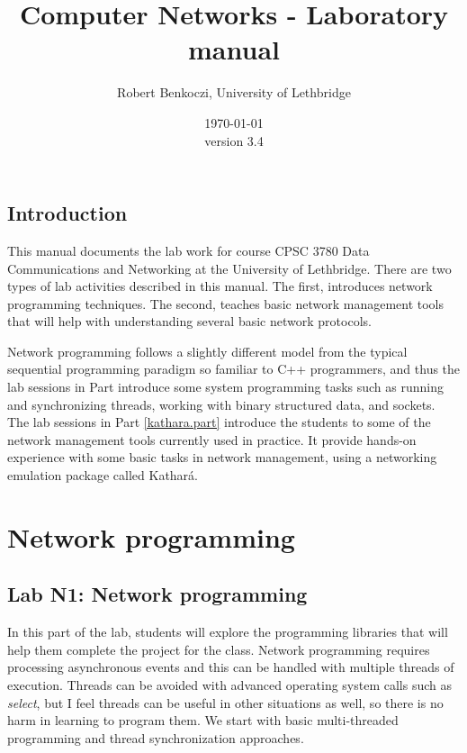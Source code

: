 \documentclass[12pt]{book}
\title{Computer Networks - Laboratory manual}    %
\author{Robert Benkoczi, University of Lethbridge}    %
\date{\today\\ version 3.4}  %
\newcommand{\kathara}{Kathar\'a}
\begin{document}
\frontmatter                            %
\maketitle    
\doclicenseThis                      
\tableofcontents                        %

\mainmatter %

\chapter{Introduction}

This manual documents the lab work for course CPSC 3780 Data Communications and Networking at the University of Lethbridge. There are two types of lab activities described in this manual. The first, introduces network programming techniques. The second, teaches basic network management tools that will help with understanding several basic network protocols.

Network programming follows a slightly different model from the typical sequential programming paradigm so familiar to C++ programmers, and thus the lab sessions in Part \ref{cpp.part} introduce some system programming tasks such as running and synchronizing threads, working with binary structured data, and sockets.
The lab sessions in Part \ref{kathara.part} introduce the students to some of the network management tools currently used in practice. It provide hands-on experience with some basic tasks in network management, using a networking emulation package called \kathara.


\part{Network programming}\label{cpp.part}

\chapter{Lab N1: Network programming}

In this part of the lab, students will explore the programming libraries that will help them complete the project for the class. Network programming requires processing asynchronous events and this can be handled with multiple threads of execution. Threads can be avoided with advanced operating system calls such as \emph{select}, but I feel threads can be useful in other situations as well, so there is no harm in learning to program them. We start with basic multi-threaded programming and thread synchronization approaches. 
\end{document}
